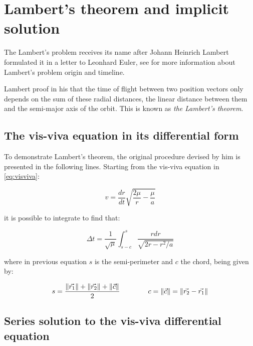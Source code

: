 \section{Lambert's theorem and implicit solution}
\label{sec:lamberts_theorem}

The Lambert's problem receives its name after Johann Heinrich Lambert formulated
it in a letter to Leonhard Euler, see \cite{albouy2019} for more information
about Lambert's problem origin and timeline.

Lambert proof in his  that the time of flight between two
position vectors only depends on the sum of these radial distances, the linear
distance between them and the semi-major axis of the orbit. This is known as
\textit{the Lambert's theorem}.

\subsection{The vis-viva equation in its differential form}

To demonstrate Lambert's theorem, the original procedure devised by him is
presented in the following lines. Starting from the vis-viva equation in
\ref{eq:visviva}:

\begin{equation}
  v = \frac{dr}{dt} \sqrt{\frac{2\mu}{r} - \frac{\mu}{a}}
  \label{eq:visviva}
\end{equation}

it is possible to integrate to find that:

\begin{equation}
  \Delta t = \frac{1}{\sqrt{\mu}} \int_{s-c}^{s} \frac{r dr}{\sqrt{2r -
      r^{2}/a}}
  \label{eq:visviva_integral}
\end{equation}

where in previous equation $s$ is the semi-perimeter and $c$ the chord, being
given by:

\begin{equation}
  s = \frac{\lVert\vec{r_{1}}\rVert + \lVert\vec{r_{2}}\rVert +
    \lVert\vec{c}\rVert}{2}\quad\quad\quad\quad
  c = \lVert\vec{c}\rVert = \lVert\vec{r_{2}} - \vec{r_{1}}\rVert
  \label{eq:s_and_c_lambert}
\end{equation}

\subsection{Series solution to the vis-viva differential equation}

